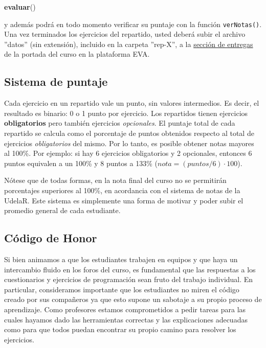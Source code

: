 \documentclass[]{article}
\newenvironment{Shaded}{}{}
\newcommand{\KeywordTok}[1]{\textcolor[rgb]{0.00,0.44,0.13}{\textbf{{#1}}}}
\newcommand{\NormalTok}[1]{{#1}}
\begin{document}
\begin{Shaded}
\begin{Highlighting}[]
\KeywordTok{evaluar}\NormalTok{()}
\end{Highlighting}
\end{Shaded}
y además podrá en todo momento verificar su puntaje con la función
\texttt{verNotas()}. Una vez terminados los ejercicios del repartido,
usted deberá subir el archivo ''datos'' (sin extensión), incluido en la
carpeta ''rep-X'', a la
\href{http://eva.universidad.edu.uy/mod/assignment/view.php?id=93616}{sección
de entregas} de la portada del curso en la plataforma EVA.

\subsection{Sistema de puntaje}

Cada ejercicio en un repartido vale un punto, sin valores intermedios.
Es decir, el resultado es binario: 0 o 1 punto por ejercicio. Los
repartidos tienen ejercicios \textbf{obligatorios} pero también
ejercicios \emph{opcionales}. El puntaje total de cada repartido se
calcula como el porcentaje de puntos obtenidos respecto al total de
ejercicios \emph{obligatorios} del mismo. Por lo tanto, es posible
obtener notas mayores al 100\%. Por ejemplo: si hay 6 ejercicios
obligatorios y 2 opcionales, entonces 6 puntos equivalen a un 100\% y 8
puntos a 133\% ($nota = (puntos / 6) \cdot 100$).

Nótese que de todas formas, en la nota final del curso no se permitirán
porcentajes superiores al 100\%, en acordancia con el sistema de notas
de la UdelaR. Este sistema es simplemente una forma de motivar y poder
subir el promedio general de cada estudiante.

\subsection{Código de Honor}

Si bien animamos a que los estudiantes trabajen en equipos y que haya un
intercambio fluido en los foros del curso, es fundamental que las
respuestas a los cuestionarios y ejercicios de programación sean fruto
del trabajo individual. En particular, consideramos importante que los
estudiantes no miren el código creado por sus compañeros ya que esto
supone un sabotaje a su propio proceso de aprendizaje. Como profesores
estamos comprometidos a pedir tareas para las cuales hayamos dado las
herramientas correctas y las explicaciones adecuadas como para que todos
puedan encontrar su propio camino para resolver los ejercicios.
\end{document}
